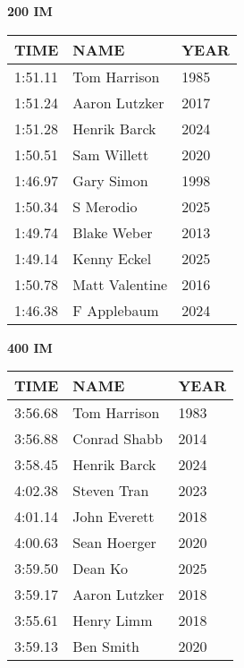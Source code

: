 \begin{table}[H]
\centering
\begin{minipage}[t]{0.48\textwidth}
\centering
\textbf{200 IM}\\[0.1cm]
\begin{tabular}{@{}p{1.8cm}p{2.8cm}p{1.2cm}@{}}
\hline
    \textbf{TIME} & \textbf{NAME} & \textbf{YEAR} \\
\hline
    1:51.11 & Tom Harrison & 1985 \\
    1:51.24 & Aaron Lutzker & 2017 \\
    1:51.28 & Henrik Barck & 2024 \\
    1:50.51 & Sam Willett & 2020 \\
    1:46.97 & Gary Simon & 1998 \\
    1:50.34 & S Merodio & 2025 \\
    1:49.74 & Blake Weber & 2013 \\
    1:49.14 & Kenny Eckel & 2025 \\
    1:50.78 & Matt Valentine & 2016 \\
    1:46.38 & F Applebaum & 2024 \\
\hline
\end{tabular}
\end{minipage}\hfill
\begin{minipage}[t]{0.48\textwidth}
\centering
\textbf{400 IM}\\[0.1cm]
\begin{tabular}{@{}p{1.8cm}p{2.8cm}p{1.2cm}@{}}
\hline
    \textbf{TIME} & \textbf{NAME} & \textbf{YEAR} \\
\hline
    3:56.68 & Tom Harrison & 1983 \\
    3:56.88 & Conrad Shabb & 2014 \\
    3:58.45 & Henrik Barck & 2024 \\
    4:02.38 & Steven Tran & 2023 \\
    4:01.14 & John Everett & 2018 \\
    4:00.63 & Sean Hoerger & 2020 \\
    3:59.50 & Dean Ko & 2025 \\
    3:59.17 & Aaron Lutzker & 2018 \\
    3:55.61 & Henry Limm & 2018 \\
    3:59.13 & Ben Smith & 2020 \\
\hline
\end{tabular}
\end{minipage}
\end{table}


